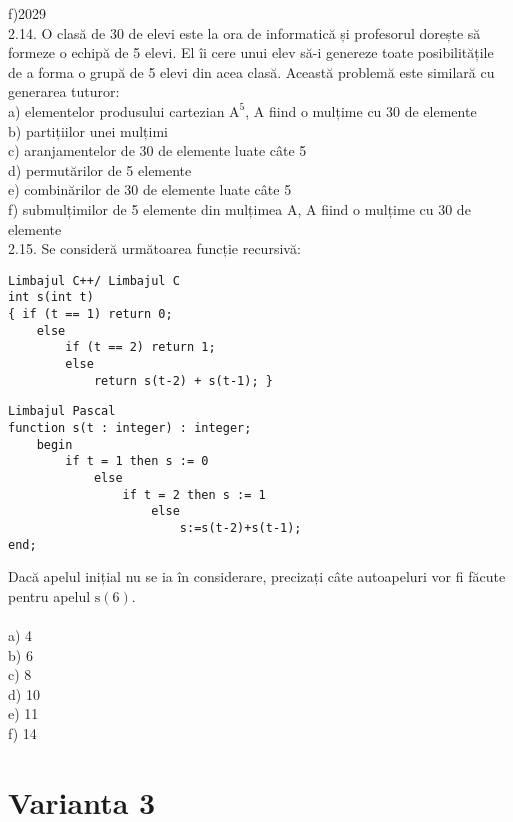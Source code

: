 f)2029
\\
2.14. O clasă de 30 de elevi este la ora de informatică și profesorul dorește să formeze o echipă de 5 elevi. El îi cere unui elev să-i genereze toate posibilitățile de a forma o grupă de 5 elevi din acea clasă. Această problemă este similară cu generarea tuturor:
\\
a) elementelor produsului cartezian $\mathrm{A}^{5}$, A fiind o mulțime cu 30 de elemente
\\
b) partițiilor unei mulțimi
\\
c) aranjamentelor de 30 de elemente luate câte 5
\\
d) permutărilor de 5 elemente
\\
e) combinărilor de 30 de elemente luate câte 5
\\
f) submulțimilor de 5 elemente din mulțimea A, A fiind o mulțime cu 30 de elemente
\\
2.15. Se consideră următoarea funcție recursivă:
\begin{verbatim}
Limbajul C++/ Limbajul C
int s(int t)
{ if (t == 1) return 0;
    else
        if (t == 2) return 1;
        else
            return s(t-2) + s(t-1); }
\end{verbatim}
\begin{verbatim}
Limbajul Pascal
function s(t : integer) : integer;
    begin
        if t = 1 then s := 0
            else
                if t = 2 then s := 1
                    else
                        s:=s(t-2)+s(t-1);
end;
\end{verbatim}
Dacă apelul inițial nu se ia în considerare, precizați câte autoapeluri vor fi făcute pentru apelul $\mathrm{s}(6)$.\\
\\
a) 4
\\
b) 6
\\
c) 8
\\
d) 10
\\
e) 11
\\
f) 14
\\

\section*{Varianta 3}

